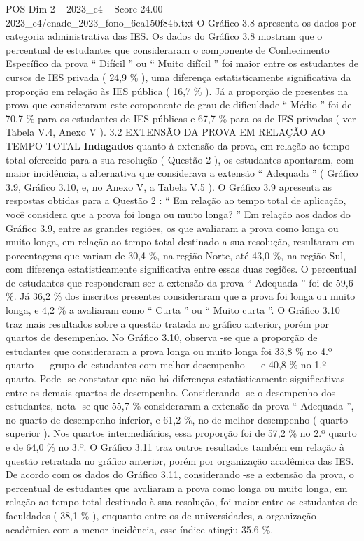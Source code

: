 \begin{textsample}{POS Dim 2 – 2023\_c4 – Score 24.00 – 2023\_c4/enade\_2023\_fono\_6ca150f84b.txt}
O Gráfico 3.8 apresenta os dados por categoria administrativa das IES.
Os dados do Gráfico 3.8 mostram que o percentual de estudantes que consideraram o componente de Conhecimento Específico da prova “ Difícil ” ou “ Muito difícil ” foi maior entre os estudantes de cursos de IES privada ( 24,9 \% ), uma diferença estatisticamente significativa da proporção em relação às IES pública ( 16,7 \% ).
Já a proporção de presentes na prova que consideraram este componente de grau de dificuldade “ Médio ” foi de 70,7 \% para os estudantes de IES públicas e 67,7 \% para os de IES privadas ( ver Tabela V.4, Anexo V ). 3.2 EXTENSÃO DA PROVA EM RELAÇÃO AO TEMPO TOTAL \textbf{Indagados} quanto à extensão da prova, em relação ao tempo total oferecido para a sua resolução ( Questão 2 ), os estudantes apontaram, com maior incidência, a alternativa que considerava a extensão “ Adequada ” ( Gráfico 3.9, Gráfico 3.10, e, no Anexo V, a Tabela V.5 ).
O Gráfico 3.9 apresenta as respostas obtidas para a Questão 2 : “ Em relação ao tempo total de aplicação, você considera que a prova foi longa ou muito longa? ” Em relação aos dados do Gráfico 3.9, entre as grandes regiões, os que avaliaram a prova como longa ou muito longa, em relação ao tempo total destinado a sua resolução, resultaram em porcentagens que variam de 30,4 \%, na região Norte, até 43,0 \%, na região Sul, com diferença estatisticamente significativa entre essas duas regiões.
O percentual de estudantes que responderam ser a extensão da prova “ Adequada ” foi de 59,6 \%.
Já 36,2 \% dos inscritos presentes consideraram que a prova foi longa ou muito longa, e 4,2 \% a avaliaram como “ Curta ” ou “ Muito curta ”.
O Gráfico 3.10 traz mais resultados sobre a questão tratada no gráfico anterior, porém por quartos de desempenho.
No Gráfico 3.10, observa -se que a proporção de estudantes que consideraram a prova longa ou muito longa foi 33,8 \% no 4.º quarto — grupo de estudantes com melhor desempenho — e 40,8 \% no 1.º quarto.
Pode -se constatar que não há diferenças estatisticamente significativas entre os demais quartos de desempenho.
Considerando -se o desempenho dos estudantes, nota -se que 55,7 \% consideraram a extensão da prova “ Adequada ”, no quarto de desempenho inferior, e 61,2 \%, no de melhor desempenho ( quarto superior ).
Nos quartos intermediários, essa proporção foi de 57,2 \% no 2.º quarto e de 64,0 \% no 3.º.
O Gráfico 3.11 traz outros resultados também em relação à questão retratada no gráfico anterior, porém por organização acadêmica das IES.
De acordo com os dados do Gráfico 3.11, considerando -se a extensão da prova, o percentual de estudantes que avaliaram a prova como longa ou muito longa, em relação ao tempo total destinado à sua resolução, foi maior entre os estudantes de faculdades ( 38,1 \% ), enquanto entre os de universidades, a organização acadêmica com a menor incidência, esse índice atingiu 35,6 \%.

\end{textsample}
